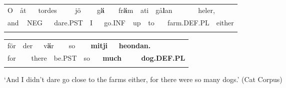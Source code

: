 \begin{tabular}{llllllllllllllllll}
\lsptoprule
O & \multicolumn{2}{l}{åt

} & \multicolumn{2}{l}{tordes

} & \multicolumn{2}{l}{jö

} & \multicolumn{2}{l}{g\textbf{ä}

} & \multicolumn{2}{l}{fr\textbf{ä}m

} & \multicolumn{2}{l}{ati

} & \multicolumn{2}{l}{gå\textbf{l}an

} & \multicolumn{2}{l}{heler,

} & \\
\multicolumn{2}{l}{and

} & \multicolumn{2}{l}{NEG

} & \multicolumn{2}{l}{dare.PST

} & \multicolumn{2}{l}{I

} & \multicolumn{2}{l}{go.INF

} & \multicolumn{2}{l}{up

} & \multicolumn{2}{l}{to

} & \multicolumn{2}{l}{farm.DEF.PL

} & \multicolumn{2}{l}{either

}\\
\lspbottomrule
\end{tabular}

\begin{tabular}{llllllllllll}
\lsptoprule
för & \multicolumn{2}{l}{der

} & \multicolumn{2}{l}{v\textbf{ä}r

} & \multicolumn{2}{l}{so

} & \multicolumn{2}{l}{{\bfseries mitji}

} & \multicolumn{2}{l}{{\bfseries heondan.}

} & \\
\multicolumn{2}{l}{for

} & \multicolumn{2}{l}{there

} & \multicolumn{2}{l}{be.PST

} & \multicolumn{2}{l}{so

} & \multicolumn{2}{l}{{\bfseries much}

} & \multicolumn{2}{l}{{\bfseries dog.DEF.PL}

}\\
\lspbottomrule
\end{tabular}

\begin{styleTranslation}
‘And I didn’t dare go close to the farms either, for there were so many dogs.’ (Cat Corpus)

\end{styleTranslation}

